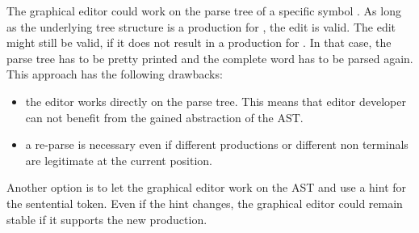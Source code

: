 The graphical editor could work on the parse tree of a specific symbol .  As long as the underlying tree structure is a production for , the edit is valid. The edit might still be valid, if it does not result in a production for . In that case, the parse tree has to be pretty printed and the complete word has to be parsed again. This approach has the following drawbacks:
\begin{itemize}
	\item the editor works directly on the parse tree. This means that editor developer can not benefit from the gained abstraction of the AST.
	\item a re-parse is necessary even if different productions or different non terminals are legitimate at the current position. 
\end{itemize}

Another option is to let the graphical editor work on the AST and use a hint for the sentential token. Even if the hint changes, the graphical editor could remain stable if it supports the new production. 



